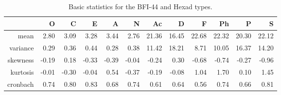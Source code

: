 \begin{table}[ht]
\centering
\begin{tabular}{rrrrrrrrrrrr}
  \toprule
 & {\textbf{O}} & {\textbf{C}} & {\textbf{E}} & {\textbf{A}} & {\textbf{N}} & {\textbf{Ac}} & {\textbf{D}} & {\textbf{F}} & {\textbf{Ph}} & {\textbf{P}} & {\textbf{S}} \\ 
  \midrule
mean & 2.80 & 3.09 & 3.28 & 3.44 & 2.76 & 21.36 & 16.45 & 22.68 & 22.32 & 20.30 & 22.12 \\ 
  variance & 0.29 & 0.36 & 0.44 & 0.28 & 0.38 & 11.42 & 18.21 & 8.71 & 10.05 & 16.37 & 14.20 \\ 
  skewness & -0.19 & 0.18 & -0.33 & -0.39 & -0.04 & -0.24 & 0.30 & -0.68 & -0.74 & -0.27 & -0.96 \\ 
  kurtosis & -0.01 & -0.30 & -0.04 & 0.54 & -0.37 & -0.19 & -0.08 & 1.04 & 1.70 & 0.10 & 1.45 \\ 
  cronbach & 0.74 & 0.80 & 0.83 & 0.68 & 0.74 & 0.61 & 0.64 & 0.56 & 0.74 & 0.66 & 0.81 \\ 
   \bottomrule
\end{tabular}
\caption{Basic statistics for the BFI-44 and Hexad types.} 
\label{tab:basicstats}
\end{table}

